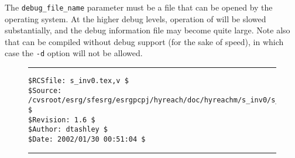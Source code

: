 The \texttt{debug\_file\_name} parameter must be a file that can be
opened by the operating system.  At the higher debug levels, operation
of \swname{} will be slowed substantially, and the debug information
file may become quite large.  Note also that \swname{} can be compiled
without debug support (for the sake of speed), in which case 
the \texttt{-d} option will not be allowed.

\noindent\begin{figure}[!b]
\noindent\rule[-0.25in]{\textwidth}{1pt}
\begin{tiny}
\begin{verbatim}
$RCSfile: s_inv0.tex,v $
$Source: /cvsroot/esrg/sfesrg/esrgpcpj/hyreach/doc/hyreachm/s_inv0/s_inv0.tex,v $
$Revision: 1.6 $
$Author: dtashley $
$Date: 2002/01/30 00:51:04 $
\end{verbatim}
\end{tiny}
\noindent\rule[0.25in]{\textwidth}{1pt}
\end{figure}
%
%
%
%
%
%
